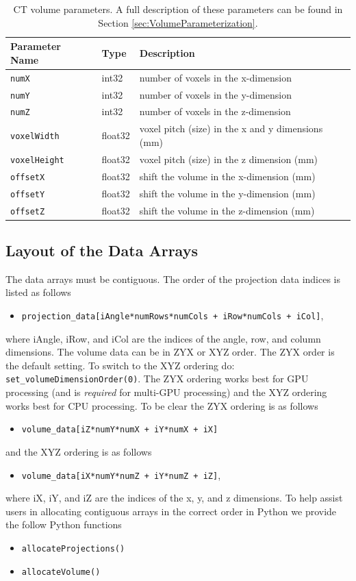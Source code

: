 \documentclass[11pt]{article}
\begin{document}
\begin{table}[h!]
\caption{CT volume parameters.  A full description of these parameters can be found in Section \ref{sec:VolumeParameterization}.} \label{tab:volumeParameters}
\begin{tabular}{l|l|p{9cm}}
Parameter Name & Type & Description \\
\hline
\texttt{numX} & int32 & number of voxels in the x-dimension \\
\texttt{numY} & int32 & number of voxels in the y-dimension \\
\texttt{numZ} & int32 & number of voxels in the z-dimension \\
\texttt{voxelWidth} & float32 & voxel pitch (size) in the x and y dimensions (mm) \\
\texttt{voxelHeight} & float32 & voxel pitch (size) in the z dimension (mm) \\
\texttt{offsetX} & float32 & shift the volume in the x-dimension (mm) \\
\texttt{offsetY} & float32 & shift the volume in the y-dimension (mm) \\
\texttt{offsetZ} & float32 & shift the volume in the z-dimension (mm)
\end{tabular}
\end{table}

\subsection{Layout of the Data Arrays} \label{sec:dataArrays}

The data arrays must be contiguous.  The order of the projection data indices is listed as follows
\begin{itemize}
\item[] \texttt{projection\_data[iAngle*numRows*numCols + iRow*numCols + iCol]},
\end{itemize}
where iAngle, iRow, and iCol are the indices of the angle, row, and column dimensions.  The volume data can be in ZYX or XYZ order.  The ZYX order is the default setting.  To switch to the XYZ ordering do: \texttt{set\_volumeDimensionOrder(0)}.  The ZYX ordering works best for GPU processing (and is \textit{required} for multi-GPU processing) and the XYZ ordering works best for CPU processing.  To be clear the ZYX ordering is as follows
\begin{itemize}
\item[] \texttt{volume\_data[iZ*numY*numX + iY*numX + iX]}
\end{itemize}
and the XYZ ordering is as follows
\begin{itemize}
\item[] \texttt{volume\_data[iX*numY*numZ + iY*numZ + iZ]},
\end{itemize}
where iX, iY, and iZ are the indices of the x, y, and z dimensions.  To help assist users in allocating contiguous arrays in the correct order in Python we provide the follow Python functions
\begin{itemize}
    \item[] \texttt{allocateProjections()}
    \item[] \texttt{allocateVolume()}
\end{itemize}
\end{document}
